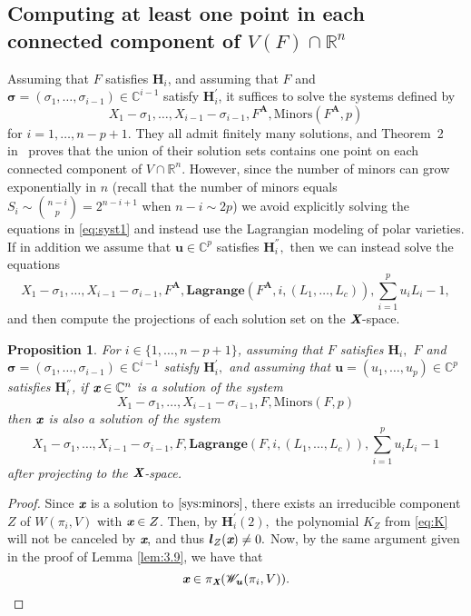 \documentclass[a4paper]{article}
\def\Xb{\textit{\textbf{X}}}
\def\mA{{\bm A}}
\def\ub{{\bm u}}
\def\lb{{\bm l}}
\def\xb{\textit{\textbf{x}}}
\def\minors{\textrm{Minors}(F,p)}
\def\minorsA{\textrm{Minors}(F^{\mA},p)}
\def\C{\mathbb{C}}
\def\R{\mathbb{R}}
\def\lagF{{\bm{Lagrange}}(F,i,(L_1,\hdots,L_c))}
\def\lagFA{{\bm{Lagrange}}(F^{\mA},i,(L_1,\hdots,L_c))}
\def\Wil{\mathscr{W}_{\ub}(\pi_i,V)}
\def\udl{\sum_{i=1}^pu_iL_i}
\newtheorem{prop}[theorem]{Proposition}
\begin{document}
\subsection{Computing at least one point in each connected component of $V(F) \cap \R^n$} 
%
Assuming that $F$ satisfies $\bm H_i$, and assuming that $F$ and $\bm \sigma = (\sigma_1,\hdots,\sigma_{i-1}) \in \C^{i-1}$ satisfy $\bm H_i^{'}$, it suffices to solve the systems defined by
%
\begin{equation}\label{eq:syst1}
X_1-\sigma_1,\dots,X_{i-1}-\sigma_{i-1}, F^{\mA},  \minorsA  
\end{equation}
%
for $i=1,\dots,n-p+1$.  They all admit finitely many solutions, and
Theorem~2 in~\cite{EMP} proves that the union of their solution sets
contains one point on each connected component of $V \cap \R^n$. However, since the number of minors can grow exponentially in $n$ (recall that the number of minors equals $S_i \sim  \binom{n-i}{p}= 2^{n-i+1}$ when $n-i \sim 2p$)
we avoid explicitly solving the equations in \eqref{eq:syst1} and instead use the Lagrangian modeling of polar varieties. If in addition we assume that $\ub \in \C^p$ satisfies $\bm H_i^{''},$ then we can instead solve the equations
%
\begin{equation}\label{eq:syst2}
X_1-\sigma_1,\dots,X_{i-1}-\sigma_{i-1}, F^{\mA}, \lagFA ,\udl-1,
\end{equation}
%
and then compute the projections of each solution set on the $\Xb$-space. 
%
\begin{prop}\label{prop:correctness}
For $i\in\{1,\hdots,n-p+1\}$, assuming that $F$ satisfies $\bm H_i,$ $F$ and $\bm \sigma = (\sigma_1,\hdots,\sigma_{i-1}) \in \C^{i-1}$ satisfy $\bm H_i^{'},$ and assuming that $\ub = (u_1,\hdots,u_p) \in \C^p$ satisfies $\bm H_i^{''}$, if $\xb \in \C^n$ is a solution of the system 
\begin{equation}\label{sys:minors}
X_1 - \sigma_1,\hdots,X_{i-1} - \sigma_{i-1}, F, \minors  
\end{equation}
then $\xb$ is also a solution of the system 
\begin{equation}\label{sys:lag}
X_1 - \sigma_1,\hdots,X_{i-1} - \sigma_{i-1}, F,\lagF,\sum_{i=1}^p u_i L_i -1
\end{equation}
after projecting to the $\Xb$-space. 
\end{prop}
\begin{proof}
Since $\xb$ is a solution to $\ref{sys:minors}$, there exists an irreducible component $Z$ of $W(\pi_i,V)$ with $\xb \in Z$. Then, by $\bm H_i^{'}(2),$ the polynomial $K_Z$ from \ref{eq:K} will not be canceled by $\xb,$ and thus $\lb_Z(\xb) \not = 0.$ Now, by the same argument given in the proof of Lemma \ref{lem:3.9}, we have that 
\[
\xb \in \pi_{\Xb} ( \Wil).
\]
\end{proof}
\end{document}

